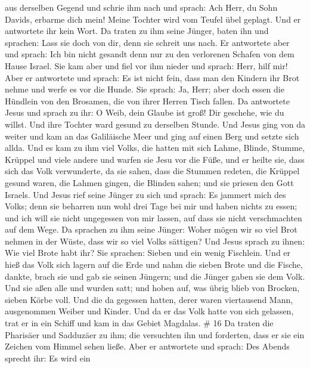 aus derselben Gegend und schrie ihm nach und sprach: Ach Herr, du Sohn
Davids, erbarme dich mein! Meine Tochter wird vom Teufel übel geplagt.
 Und er antwortete ihr kein Wort. Da traten zu ihm seine
Jünger, baten ihn und sprachen: Lass sie doch von dir, denn sie schreit
uns nach.  Er antwortete aber und sprach: Ich bin nicht
gesandt denn nur zu den verlorenen Schafen von dem Hause Israel.
 Sie kam aber und fiel vor ihm nieder und sprach: Herr,
hilf mir!  Aber er antwortete und sprach: Es ist nicht
fein, dass man den Kindern ihr Brot nehme und werfe es vor die Hunde.
 Sie sprach: Ja, Herr; aber doch essen die Hündlein von den
Brosamen, die von ihrer Herren Tisch fallen.  Da antwortete
Jesus und sprach zu ihr: O Weib, dein Glaube ist groß! Dir geschehe, wie
du willst. Und ihre Tochter ward gesund zu derselben Stunde.
 Und Jesus ging von da weiter und kam an das Galiläische
Meer und ging auf einen Berg und setzte sich allda.  Und es
kam zu ihm viel Volks, die hatten mit sich Lahme, Blinde, Stumme,
Krüppel und viele andere und warfen sie Jesu vor die Füße, und er heilte
sie,  dass sich das Volk verwunderte, da sie sahen, dass
die Stummen redeten, die Krüppel gesund waren, die Lahmen gingen, die
Blinden sahen; und sie priesen den Gott Israels.  Und Jesus
rief seine Jünger zu sich und sprach: Es jammert mich des Volks; denn
sie beharren nun wohl drei Tage bei mir und haben nichts zu essen; und
ich will sie nicht ungegessen von mir lassen, auf dass sie nicht
verschmachten auf dem Wege.  Da sprachen zu ihm seine
Jünger: Woher mögen wir so viel Brot nehmen in der Wüste, dass wir so
viel Volks sättigen?  Und Jesus sprach zu ihnen: Wie viel
Brote habt ihr? Sie sprachen: Sieben und ein wenig Fischlein.
 Und er hieß das Volk sich lagern auf die Erde
 und nahm die sieben Brote und die Fische, dankte, brach
sie und gab sie seinen Jüngern; und die Jünger gaben sie dem Volk.
 Und sie aßen alle und wurden satt; und hoben auf, was
übrig blieb von Brocken, sieben Körbe voll.  Und die da
gegessen hatten, derer waren viertausend Mann, ausgenommen Weiber und
Kinder.  Und da er das Volk hatte von sich gelassen, trat
er in ein Schiff und kam in das Gebiet Magdalas. \# 16  Da
traten die Pharisäer und Sadduzäer zu ihm; die versuchten ihn und
forderten, dass er sie ein Zeichen vom Himmel sehen ließe. 
Aber er antwortete und sprach: Des Abends sprecht ihr: Es wird ein
